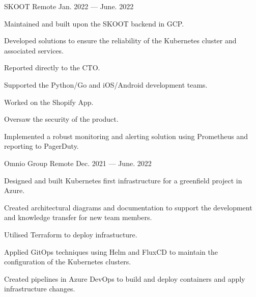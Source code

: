 

\begin{cventries}

    {SKOOT}
    {Remote}
    {Jan. 2022 — June. 2022}
    {
        \begin{cvitems}
        \item{Maintained and built upon the SKOOT backend in GCP.}
        \item{Developed solutions to ensure the reliability of the Kubernetes cluster and associated services.}
        \item{Reported directly to the CTO.}
        \item{Supported the Python/Go and iOS/Android development teams.}
	      \item{Worked on the Shopify App.}
        \item{Oversaw the security of the product.}
	      \item{Implemented a robust monitoring and alerting solution using Prometheus and reporting to PagerDuty.}
        \end{cvitems}
    }

    {Omnio Group}
    {Remote}
    {Dec. 2021 — June. 2022}
    {
        \begin{cvitems}
        \item{Designed and built Kubernetes first infrastructure for a greenfield project in Azure.}
        \item{Created architectural diagrams and documentation to support the development and knowledge transfer for new team members.}
        \item{Utilised Terraform to deploy infrastucture.}
        \item{Applied GitOps techniques using Helm and FluxCD to maintain the configuration of the Kubernetes clusters.}
        \item{Created pipelines in Azure DevOps to build and deploy containers and apply infrastructure changes.}
        \end{cvitems}
    }


\end{cventries}
